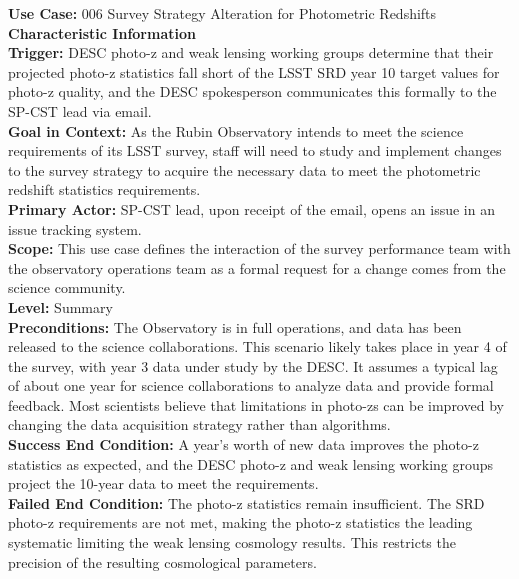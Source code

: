 \textbf{Use Case:} 006 Survey Strategy Alteration for Photometric Redshifts \\

\textbf{Characteristic Information} \\
\textbf{Trigger:} DESC photo-z and weak lensing working groups determine that their projected photo-z statistics fall short of the LSST SRD year 10 target values for photo-z quality, and the DESC spokesperson communicates this formally to the SP-CST lead via email. \\
\textbf{Goal in Context:} As the Rubin Observatory intends to meet the science requirements of its LSST survey, staff will need to study and implement changes to the survey strategy to acquire the necessary data to meet the photometric redshift statistics requirements. \\
\textbf{Primary Actor:} SP-CST lead, upon receipt of the email, opens an issue in an issue tracking system. \\
\textbf{Scope:} This use case defines the interaction of the survey performance team with the observatory operations team as a formal request for a change comes from the science community. \\
\textbf{Level:} Summary \\
\textbf{Preconditions:} The Observatory is in full operations, and data has been released to the science collaborations. This scenario likely takes place in year 4 of the survey, with year 3 data under study by the DESC. It assumes a typical lag of about one year for science collaborations to analyze data and provide formal feedback. Most scientists believe that limitations in photo-zs can be improved by changing the data acquisition strategy rather than algorithms. \\
\textbf{Success End Condition:} A year's worth of new data improves the photo-z statistics as expected, and the DESC photo-z and weak lensing working groups project the 10-year data to meet the requirements. \\
\textbf{Failed End Condition:} The photo-z statistics remain insufficient. The SRD photo-z requirements are not met, making the photo-z statistics the leading systematic limiting the weak lensing cosmology results. This restricts the precision of the resulting cosmological parameters. \\

